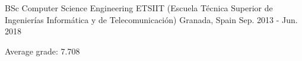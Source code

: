 

\begin{cventries}

  \cventry
    {BSc Computer Science Engineering} %
    {ETSIIT (Escuela Técnica Superior de Ingenierías Informática y de Telecomunicación)} %
    {Granada, Spain} %
    {Sep. 2013 - Jun. 2018} %
    {
      \begin{cvitems} %
        \item {Average grade: 7.708}
      \end{cvitems}
    }

\end{cventries}
